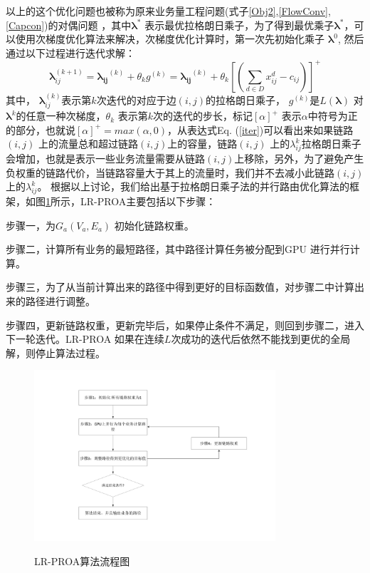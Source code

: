 以上的这个优化问题也被称为原来业务量工程问题(式子\ref{Obj2},\ref{FlowConv},\ref{Capcon})的对偶问题 ，其中$\mathbf{\lambda^*}$ 表示最优拉格朗日乘子，为了得到最优乘子$\mathbf{\lambda^*}$，可以使用次梯度优化算法来解决，次梯度优化计算时，第一次先初始化乘子 $\mathbf{\lambda}^0$, 然后通过以下过程进行迭代求解：
\begin{equation}\label{iter}
\mathbf{\lambda}_{ij}^{(k+1)} =\mathbf{\lambda_{ij}}^{(k)}+\theta_{k} g^{(k)}= \mathbf{\lambda_{ij}}^{(k)} + \theta_k[(\sum\limits_{d \in D}x_{ij}^d - c_{ij})]^+
\end{equation}
其中， $\mathbf{\lambda}_{ij}^{(k)}$表示第$k$次迭代的对应于边$(i,j)$的拉格朗日乘子， $g^{(k)}$是$L(\mathbf{\lambda})$ 对$\mathbf{\lambda}^{k}$的任意一种次梯度，$\theta_k$ 表示第$k$次的迭代的步长，标记$[\alpha]^+$ 表示$\alpha$中符号为正的部分，也就说$[\alpha]^+=max(\alpha, 0)$，从表达式Eq. (\ref{iter})可以看出来如果链路$(i,j)$ 上的流量总和超过链路$(i,j)$上的容量，链路$(i,j)$ 上的$\lambda_{ij}^k$拉格朗日乘子会增加，也就是表示一些业务流量需要从链路$(i,j)$上移除，另外，为了避免产生负权重的链路代价，当链路容量大于其上的流量时，我们并不去减小此链路$(i,j)$上的$\lambda_{ij}^k$。
根据以上讨论，我们给出基于拉格朗日乘子法的并行路由优化算法的框架，如图\ref{lpl}所示，LR-PROA主要包括以下步骤：

步骤一，为$G_a(V_a, E_a)$ 初始化链路权重。

步骤二，计算所有业务的最短路径，其中路径计算任务被分配到GPU 进行并行计算。

步骤三，为了从当前计算出来的路径中得到更好的目标函数值，对步骤二中计算出来的路径进行调整。

步骤四，更新链路权重，更新完毕后，如果停止条件不满足，则回到步骤二，进入下一轮迭代。LR-PROA 如果在连续$L$次成功的迭代后依然不能找到更优的全局解，则停止算法过程。
\begin{figure}
\begin{center}
{\includegraphics[width=0.8\textwidth]{figures/lagrange.pdf}}
\end{center}
\caption{{\footnotesize{LR-PROA算法流程图}}}
\label{lpl}
\end{figure}
